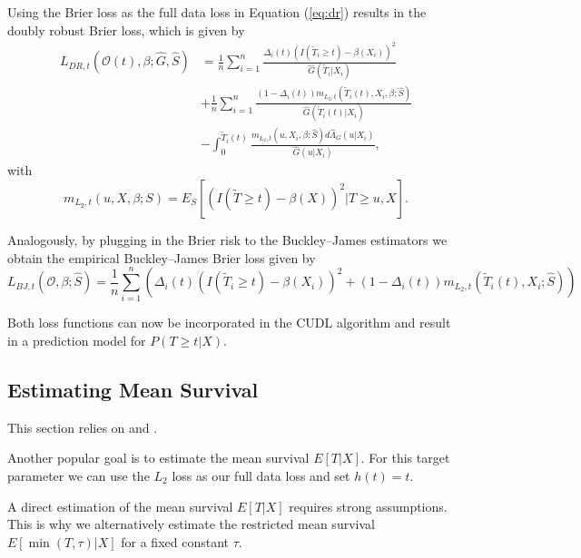 \documentclass[12pt, a4paper]{scrartcl}
\theoremstyle{definition}
\theoremstyle{plain}
\numberwithin{equation}{section}
\numberwithin{figure}{section}
\numberwithin{table}{section}
\begin{document}
	Using the Brier loss as the full data loss in Equation (\ref{eq:dr}) results in the doubly robust Brier loss, which is given by
	\begin{equation*}
	\begin{split}
		L_{DR, t}(\mathcal{O}(t),\beta; \hat{G},\hat{S}) &={}  \frac{1}{n} \sum_{i=1}^n \frac{\Delta_i(t)(I(\tilde{T}_i \geq t)-\beta(X_i))^2}{\hat{G}(\tilde{T}_i \vert X_i)}\\
		& + \frac{1}{n} \sum_{i=1}^n \frac{(1-\Delta_i(t))m_{L_2,t}(\tilde{T}_i(t),X_i,\beta; \hat{S})}{\hat{G}(\tilde{T}_i(t) \vert X_i)}\\
		& - \int_{0}^{\tilde{T}_i(t)} \frac{m_{L_2,t}(u,X_i,\beta; \hat{S})d\hat{\Lambda}_G(u\vert X_i)}{\hat{G}(u \vert X_i)},
	\end{split}
	\end{equation*}
	 with
	 \begin{equation*}
	 	m_{L_2,t}(u,X,\beta;S) = E_S[(I(\tilde{T}\geq t)-\beta(X))^2 \vert T \geq u, X].
	 \end{equation*}
	
	Analogously, by plugging in the Brier risk to the Buckley--James estimators we obtain the empirical Buckley--James Brier loss given by
	\begin{equation*}
		L_{BJ,t}(\mathcal{O},\beta; \hat{S}) = \frac{1}{n} \sum_{i=1}^n \left( \Delta_i(t)(I(\tilde{T}_i\geq t)-\beta(X_i))^2 + (1- \Delta_i(t))m_{L_2,t}(\tilde{T}_i(t), X_i; \hat{S})\right)
	\end{equation*}
	
	Both loss functions can now be incorporated in the CUDL algorithm and result in a prediction model for $P(T\geq t\vert X)$.

	\subsection{Estimating Mean Survival}
	
	This section relies on \citet*{basearticle} and \citet*{strawderman}.
	
	Another popular goal is to estimate the mean survival $E[T\vert X]$.
	For this target parameter we can use the $L_2$ loss as our full data loss and set $h(t)=t$.
	
	A direct estimation of the mean survival $E[T\vert X]$ requires strong assumptions.
	This is why we alternatively estimate the restricted mean survival $E[\min(T, \tau)\vert X]$ for a fixed constant $\tau$.
	
\end{document}

